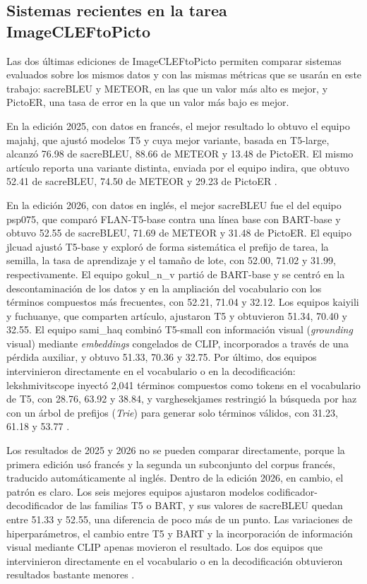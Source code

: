 \subsection{Sistemas recientes en la tarea ImageCLEFtoPicto}

Las dos últimas ediciones de ImageCLEFtoPicto permiten comparar sistemas evaluados sobre los mismos datos y con las mismas métricas que se usarán en este trabajo: sacreBLEU y METEOR, en las que un valor más alto es mejor, y PictoER, una tasa de error en la que un valor más bajo es mejor.

En la edición 2025, con datos en francés, el mejor resultado lo obtuvo el equipo majahj, que ajustó modelos T5 y cuya mejor variante, basada en T5-large, alcanzó 76.98 de sacreBLEU, 88.66 de METEOR y 13.48 de PictoER. El mismo artículo reporta una variante distinta, enviada por el equipo indira, que obtuvo 52.41 de sacreBLEU, 74.50 de METEOR y 29.23 de PictoER \cite{Hjuler2025Parlez}.

En la edición 2026, con datos en inglés, el mejor sacreBLEU fue el del equipo psp075, que comparó FLAN-T5-base contra una línea base con BART-base y obtuvo 52.55 de sacreBLEU, 71.69 de METEOR y 31.48 de PictoER. El equipo jlcuad ajustó T5-base y exploró de forma sistemática el prefijo de tarea, la semilla, la tasa de aprendizaje y el tamaño de lote, con 52.00, 71.02 y 31.99, respectivamente. El equipo gokul\_n\_v partió de BART-base y se centró en la descontaminación de los datos y en la ampliación del vocabulario con los términos compuestos más frecuentes, con 52.21, 71.04 y 32.12. Los equipos kaiyili y fuchuanye, que comparten artículo, ajustaron T5 y obtuvieron 51.34, 70.40 y 32.55. El equipo sami\_haq combinó T5-small con información visual (\textit{grounding} visual) mediante \textit{embeddings} congelados de CLIP, incorporados a través de una pérdida auxiliar, y obtuvo 51.33, 70.36 y 32.75. Por último, dos equipos intervinieron directamente en el vocabulario o en la decodificación: lekshmivitscope inyectó 2,041 términos compuestos como tokens en el vocabulario de T5, con 28.76, 63.92 y 38.84, y varghesekjames restringió la búsqueda por haz con un árbol de prefijos (\textit{Trie}) para generar solo términos válidos, con 31.23, 61.18 y 53.77 \cite{Hjuler2026}.

Los resultados de 2025 y 2026 no se pueden comparar directamente, porque la primera edición usó francés y la segunda un subconjunto del corpus francés, traducido automáticamente al inglés. Dentro de la edición 2026, en cambio, el patrón es claro. Los seis mejores equipos ajustaron modelos codificador-decodificador de las familias T5 o BART, y sus valores de sacreBLEU quedan entre 51.33 y 52.55, una diferencia de poco más de un punto. Las variaciones de hiperparámetros, el cambio entre T5 y BART y la incorporación de información visual mediante CLIP apenas movieron el resultado. Los dos equipos que intervinieron directamente en el vocabulario o en la decodificación obtuvieron resultados bastante menores \cite{Hjuler2026}.

